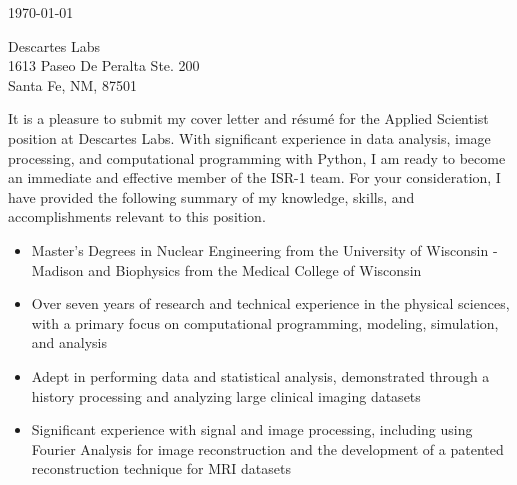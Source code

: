 
\begin{center}
\begin{minipage}{\textwidth}

  \normalsize

  \vspace{6mm} 

  \today \\
  \vspace{4mm}
	
	Descartes Labs \\
	1613 Paseo De Peralta Ste. 200 \\
	Santa Fe, NM, 87501
  
  \vspace{4mm} 


  It is a pleasure to submit my cover letter and r\'{e}sum\'{e} for the Applied Scientist position at Descartes Labs.
  With significant experience in data analysis, image processing, and computational programming with Python, I am ready to become an immediate and effective member of the ISR-1 team.
  For your consideration, I have provided the following summary of my knowledge, skills, and accomplishments relevant to this position. \\

  \begin{itemize}[leftmargin=.45in,rightmargin=.45in,itemsep=1.6mm]

	\item Master's Degrees in Nuclear Engineering from the University of Wisconsin - Madison and Biophysics from the Medical College of Wisconsin

	\item Over seven years of research and technical experience in the physical sciences, with a primary focus on computational programming, modeling, simulation, and analysis

	\item Adept in performing data and statistical analysis, demonstrated through a history processing and analyzing large clinical imaging datasets

	\item Significant experience with signal and image processing, including using Fourier Analysis for image reconstruction and the development of a patented reconstruction technique for MRI datasets


\end{itemize}
\end{minipage}
\end{center}

